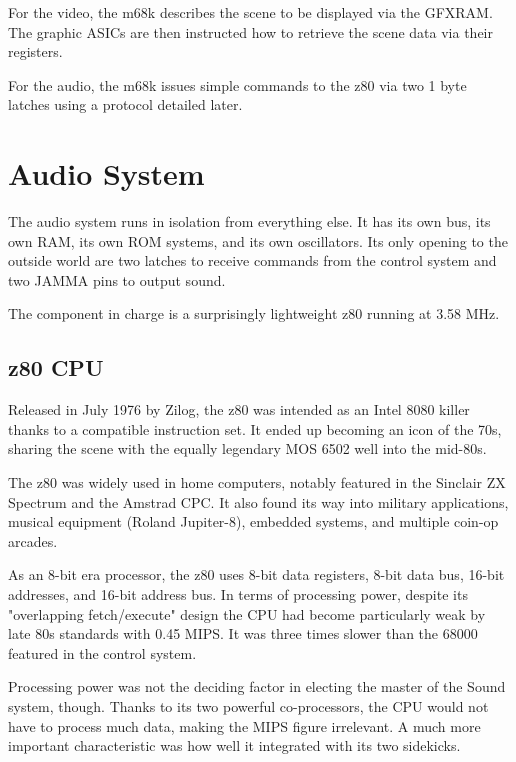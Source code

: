 For the video, the m68k describes the scene to be displayed via the GFXRAM. The graphic ASICs are then instructed how to retrieve the scene data via their registers. 

For the audio, the m68k issues simple commands to the z80 via two 1 byte latches using a protocol detailed later.
  











\pagebreak
\section{Audio System}
The audio system runs in isolation from everything else. It has its own bus, its own RAM, its own ROM systems, and its own oscillators. Its only opening to the outside world are two latches to receive commands from the control system and two JAMMA pins to output sound.

The component in charge is a surprisingly lightweight z80 running at 3.58 MHz.

\subsection{z80 CPU}
Released in July 1976 by Zilog, the z80 was intended as an Intel 8080 killer thanks to a compatible instruction set. It ended up becoming an icon of the 70s, sharing the scene with the equally legendary MOS 6502 well into the mid-80s. 

The z80 was widely used in home computers, notably featured in the Sinclair ZX Spectrum and the Amstrad CPC. It also found its way into military applications, musical equipment (Roland Jupiter-8), embedded systems, and multiple coin-op arcades. 

As an 8-bit era processor, the z80 uses 8-bit data registers, 8-bit data bus, 16-bit addresses, and 16-bit address bus. In terms of processing power, despite its "overlapping fetch/execute" design the CPU had become particularly weak by late 80s standards with 0.45 MIPS. It was three times slower than the 68000 featured in the control system\cite{mips}. 


Processing power was not the deciding factor in electing the master of the Sound system, though. Thanks to its two powerful co-processors, the CPU would not have to process much data, making the MIPS figure irrelevant. A much more important characteristic was how well it integrated with its two sidekicks.

